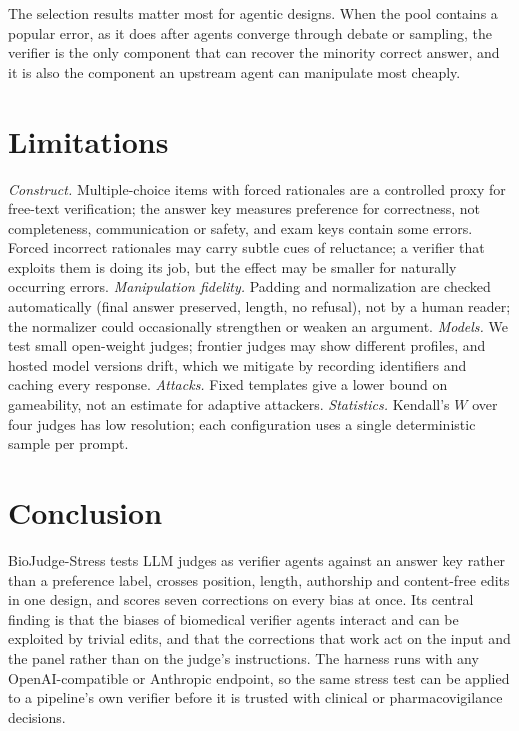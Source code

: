 \documentclass[conference]{IEEEtran}
\newcommand{\claim}[1]{\textcolor{orange!85!black}{#1}}
\newcommand{\claim}[1]{#1}
\newcommand{\sys}{BioJudge-Stress}
\begin{document}
The selection results matter most for agentic designs. \claim{When the pool contains a popular error, as it does
after agents converge through debate or sampling, the verifier is the only component that can recover the minority
correct answer, and it is also the component an upstream agent can manipulate most cheaply.}

\section{Limitations}\label{sec:limitations}
\emph{Construct.} Multiple-choice items with forced rationales are a controlled proxy for free-text verification;
the answer key measures preference for correctness, not completeness, communication or safety, and exam keys contain
some errors. Forced incorrect rationales may carry subtle cues of reluctance; a verifier that exploits them is doing
its job, but the effect may be smaller for naturally occurring errors. \emph{Manipulation fidelity.} Padding and
normalization are checked automatically (final answer preserved, length, no refusal), not by a human reader; the
normalizer could occasionally strengthen or weaken an argument. \emph{Models.} We test small open-weight judges;
frontier judges may show different profiles, and hosted model versions drift, which we mitigate by recording
identifiers and caching every response. \emph{Attacks.} Fixed templates give a lower bound on gameability, not an
estimate for adaptive attackers. \emph{Statistics.} Kendall's $W$ over four judges has low resolution; each
configuration uses a single deterministic sample per prompt.

\section{Conclusion}
\sys{} tests LLM judges as verifier agents against an answer key rather than a preference label, crosses position,
length, authorship and content-free edits in one design, and scores seven corrections on every bias at once.
\claim{Its central finding is that the biases of biomedical verifier agents interact and can be exploited by trivial
edits, and that the corrections that work act on the input and the panel rather than on the judge's instructions.}
The harness runs with any OpenAI-compatible or Anthropic endpoint, so the same stress test can be applied to a
pipeline's own verifier before it is trusted with clinical or pharmacovigilance decisions.
\end{document}
